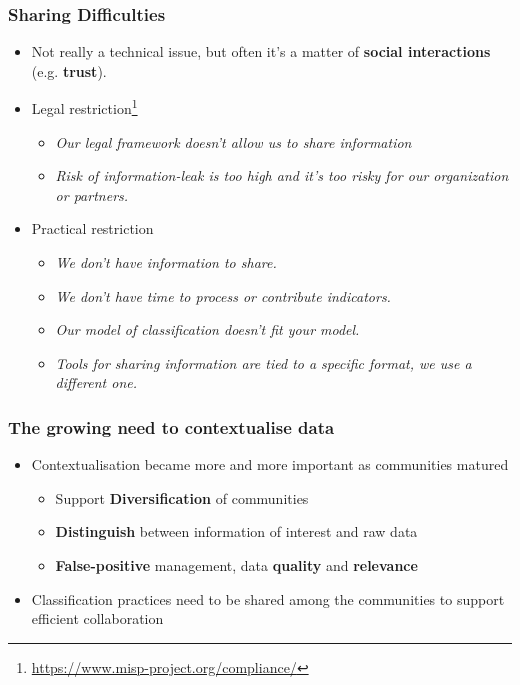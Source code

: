 \begin{frame}
\frametitle{Sharing Difficulties}
\begin{itemize}
    \item Not really a technical issue, but often it's a matter of {\bf social interactions} (e.g. {\bf trust}).
    \item Legal restriction\footnote{\url{https://www.misp-project.org/compliance/}}
    \begin{itemize}
        \item \textit{Our legal framework doesn't allow us to share information}
        \item \textit{Risk of information-leak is too high and it's too risky for our organization or partners.}
    \end{itemize}
    \item Practical restriction
    \begin{itemize}
        \item \textit{We don't have information to share.}
        \item \textit{We don't have time to process or contribute indicators.}
        \item \textit{Our model of classification doesn't fit your model.}
        \item \textit{Tools for sharing information are tied to a specific format, we use a different one.}
    \end{itemize}
\end{itemize}
\end{frame}

\begin{frame}
\frametitle{The growing need to contextualise data}
\begin{itemize}
    \item Contextualisation became more and more important as communities matured
    \begin{itemize}
        \item Support {\bf Diversification} of communities
        \item {\bf Distinguish} between information of interest and raw data
        \item {\bf False-positive} management, data {\bf quality} and {\bf relevance}
    \end{itemize}
    \item Classification practices need to be shared among the communities to support efficient collaboration
\end{itemize}
\end{frame}

